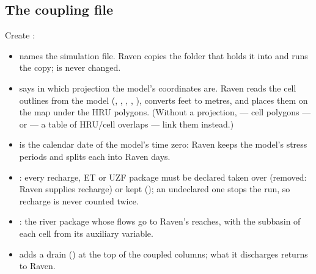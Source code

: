 \subsection{The coupling file}
Create :

\begin{itemize}
\item {} names the simulation file. Raven copies the folder that holds it into  and runs the
      copy;  is never changed.
\item {} says in which projection the model's coordinates are. Raven reads the cell outlines from the model
      (, , , , ), converts feet to metres, and places them on the map
      under the HRU polygons. (Without a projection,  --- cell polygons --- or  ---
      a table of HRU/cell overlaps --- link them instead.)
\item {} is the calendar date of the model's time zero: Raven keeps the model's stress periods and splits
      each into Raven days.
\item {}: every recharge, ET or UZF package must be declared taken over (removed:
      Raven supplies recharge) or kept (); an undeclared one stops the run, so recharge is never counted
      twice.
\item {}: the river package whose flows go to Raven's reaches, with the subbasin of
      each cell from its auxiliary variable.
\item {} adds a drain () at the top of the coupled columns; what it discharges returns
      to Raven.
\end{itemize}

